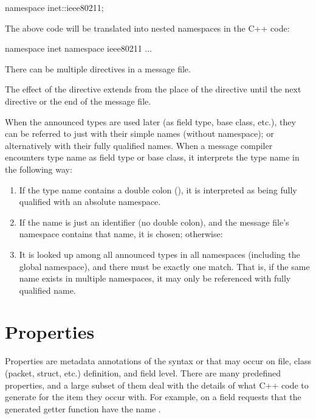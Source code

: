 \begin{msg}
namespace inet::ieee80211;
\end{msg}

The above code will be translated into nested namespaces in the C++ code:

\begin{cpp}
namespace inet { namespace ieee80211 {
...
}}
\end{cpp}

There can be multiple  directives in a message file.

The effect of the  directive extends from the place of the
directive until the next  directive or the end of the message
file.

When the announced types are used later (as field type, base class, etc.),
they can be referred to just with their simple names (without namespace);
or alternatively with their fully qualified names. When a message compiler
encounters type name as field type or base class, it interprets the type
name in the following way:


\begin{enumerate}
\item If the type name contains a double colon (\ttt{::}), it is interpreted
      as being fully qualified with an absolute namespace.
\item If the name is just an identifier (no double colon), and the message
      file's namespace contains that name, it is chosen; otherwise:
\item It is looked up among all announced types in all namespaces (including
      the global namespace), and there must be exactly one match. That is,
      if the same name exists in multiple namespaces, it may only be
      referenced with fully qualified name.
\end{enumerate}


\section{Properties}
\label{sec:msg-defs:properties}

Properties are metadata annotations of the syntax  or
 that may occur on file, class (packet, struct, etc.)
definition, and field level. There are many predefined properties, and a
large subset of them deal with the details of what C++ code to generate for the
item they occur with. For example,  on a field requests
that the generated getter function have the name .

